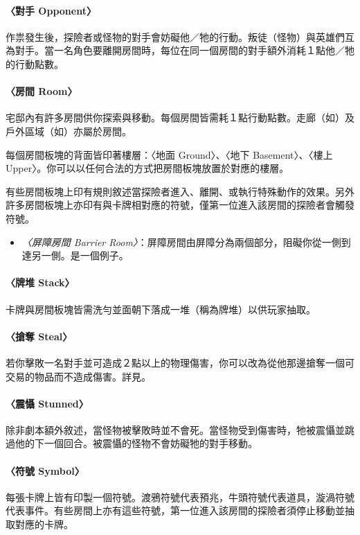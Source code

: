 \paragraph{〈對手 Opponent〉}
作祟發生後，探險者或怪物的對手會妨礙他／牠的行動。叛徒（怪物）與英雄們互為對手。當一名角色要離開房間時，每位在同一個房間的對手額外消耗１點他／牠的行動點數。

\paragraph{〈房間 Room〉}
宅邸內有許多房間供你探索與移動。每個房間皆需耗１點行動點數。走廊（如）及戶外區域（如）亦屬於房間。

每個房間板塊的背面皆印著樓層：〈地面 Ground〉、〈地下 Basement〉、〈樓上 Upper〉。你可以以任何合法的方式把房間板塊放置於對應的樓層。

有些房間板塊上印有規則敘述當探險者進入、離開、或執行特殊動作的效果。另外許多房間板塊上亦印有與卡牌相對應的符號，僅第一位進入該房間的探險者會觸發符號。

\begin{itemize}
  \item \textit{〈屏障房間 Barrier Room〉}：屏障房間由屏障分為兩個部分，阻礙你從一側到達另一側。是一個例子。
\end{itemize}

\paragraph{〈牌堆 Stack〉}
卡牌與房間板塊皆需洗勻並面朝下落成一堆（稱為牌堆）以供玩家抽取。

\paragraph{〈搶奪 Steal〉}
若你擊敗一名對手並可造成２點以上的物理傷害，你可以改為從他那邊搶奪一個可交易的物品而不造成傷害。詳見。

\paragraph{〈震懾 Stunned〉}
除非劇本額外敘述，當怪物被擊敗時並不會死。當怪物受到傷害時，牠被震懾並跳過他的下一個回合。被震懾的怪物不會妨礙牠的對手移動。

\paragraph{〈符號 Symbol〉}
每張卡牌上皆有印製一個符號。渡鴉符號\OmenSymbol{}代表預兆，牛頭符號\ItemSymbol{}代表道具，漩渦符號\EventSymbol{}代表事件。有些房間上亦有這些符號，第一位進入該房間的探險者須停止移動並抽取對應的卡牌。

